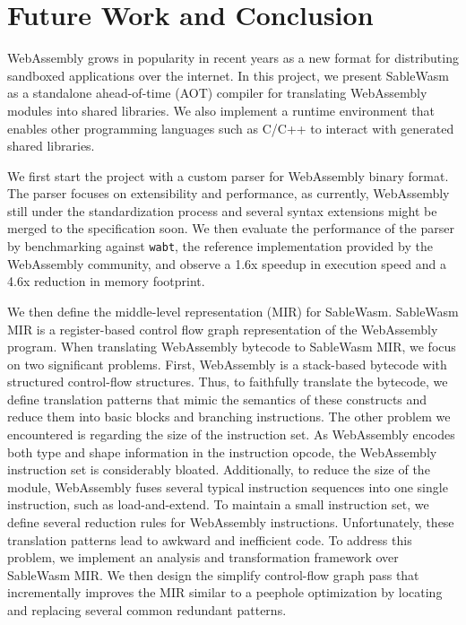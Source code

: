 \chapter{Future Work and Conclusion}

WebAssembly grows in popularity in recent years as a new format for distributing sandboxed applications over the internet. In this project, we present SableWasm as a standalone ahead-of-time (AOT) compiler for translating WebAssembly modules into shared libraries. We also implement a runtime environment that enables other programming languages such as C/C++ to interact with generated shared libraries.

We first start the project with a custom parser for WebAssembly binary format. The parser focuses on extensibility and performance, as currently, WebAssembly still under the standardization process and several syntax extensions might be merged to the specification soon. We then evaluate the performance of the parser by benchmarking against \texttt{wabt}, the reference implementation provided by the WebAssembly community, and observe a 1.6x speedup in execution speed and a 4.6x reduction in memory footprint.

We then define the middle-level representation (MIR) for SableWasm. SableWasm MIR is a register-based control flow graph representation of the WebAssembly program. When translating WebAssembly bytecode to SableWasm MIR, we focus on two significant problems. First, WebAssembly is a stack-based bytecode with structured control-flow structures. Thus, to faithfully translate the bytecode, we define translation patterns that mimic the semantics of these constructs and reduce them into basic blocks and branching instructions. The other problem we encountered is regarding the size of the instruction set. As WebAssembly encodes both type and shape information in the instruction opcode, the WebAssembly instruction set is considerably bloated. Additionally, to reduce the size of the module, WebAssembly fuses several typical instruction sequences into one single instruction, such as load-and-extend. To maintain a small instruction set, we define several reduction rules for WebAssembly instructions. Unfortunately, these translation patterns lead to awkward and inefficient code. To address this problem, we implement an analysis and transformation framework over SableWasm MIR. We then design the simplify control-flow graph pass that incrementally improves the MIR similar to a peephole optimization by locating and replacing several common redundant patterns.

